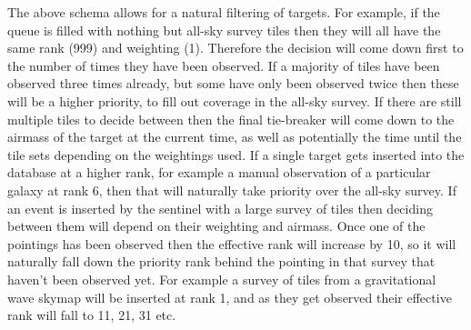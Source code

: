 \begin{colsection}
\begin{colsection}
The above schema allows for a natural filtering of targets. For example, if the queue is filled with nothing but all-sky survey tiles then they will all have the same rank (999) and weighting (1). Therefore the decision will come down first to the number of times they have been observed. If a majority of tiles have been observed three times already, but some have only been observed twice then these will be a higher priority, to fill out coverage in the all-sky survey. If there are still multiple tiles to decide between then the final tie-breaker will come down to the airmass of the target at the current time, as well as potentially the time until the tile sets depending on the weightings used. If a single target gets inserted into the database at a higher rank, for example a manual observation of a particular galaxy at rank 6, then that will naturally take priority over the all-sky survey. If an event is inserted by the sentinel with a large survey of tiles then deciding between them will depend on their weighting and airmass. Once one of the pointings has been observed then the effective rank will increase by 10, so it will naturally fall down the priority rank behind the pointing in that survey that haven't been observed yet. For example a survey of tiles from a gravitational wave skymap will be inserted at rank 1, and as they get observed their effective rank will fall to 11, 21, 31 etc.

\end{colsection}


\end{colsection}

